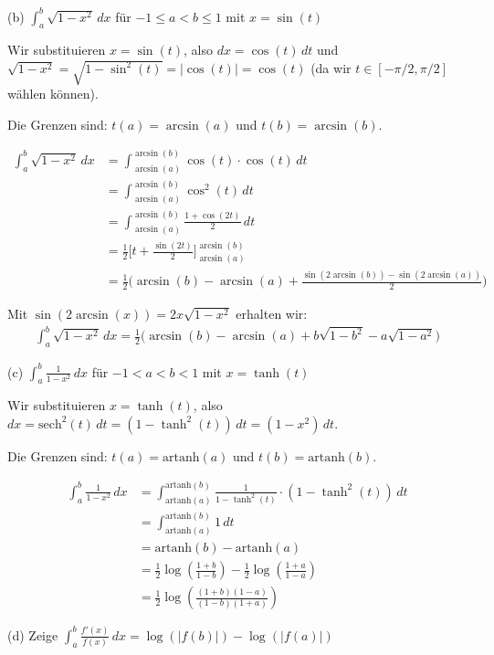 \documentclass{article}
\begin{document}
(b) $\int_a^b \sqrt{1-x^2}\,dx$ für $-1 \leq a < b \leq 1$ mit $x = \sin(t)$

Wir substituieren $x = \sin(t)$, also $dx = \cos(t)\,dt$ und $\sqrt{1-x^2} = \sqrt{1-\sin^2(t)} = |\cos(t)| = \cos(t)$ 
(da wir $t \in [-\pi/2, \pi/2]$ wählen können).

Die Grenzen sind: $t(a) = \arcsin(a)$ und $t(b) = \arcsin(b)$.

\begin{align}
\int_a^b \sqrt{1-x^2}\,dx &= \int_{\arcsin(a)}^{\arcsin(b)} \cos(t) \cdot \cos(t)\,dt \\
&= \int_{\arcsin(a)}^{\arcsin(b)} \cos^2(t)\,dt \\
&= \int_{\arcsin(a)}^{\arcsin(b)} \frac{1 + \cos(2t)}{2}\,dt \\
&= \frac{1}{2}\Big[t + \frac{\sin(2t)}{2}\Big]_{\arcsin(a)}^{\arcsin(b)} \\
&= \frac{1}{2}\Big(\arcsin(b) - \arcsin(a) + \frac{\sin(2\arcsin(b)) - \sin(2\arcsin(a))}{2}\Big)
\end{align}

Mit $\sin(2\arcsin(x)) = 2x\sqrt{1-x^2}$ erhalten wir:
\begin{align}
\int_a^b \sqrt{1-x^2}\,dx = \frac{1}{2}\Big(\arcsin(b) - \arcsin(a) + b\sqrt{1-b^2} - a\sqrt{1-a^2}\Big)
\end{align}

(c) $\int_a^b \frac{1}{1-x^2}\,dx$ für $-1 < a < b < 1$ mit $x = \tanh(t)$

Wir substituieren $x = \tanh(t)$, also $dx = \mathrm{sech}^2(t)\,dt = (1-\tanh^2(t))\,dt = (1-x^2)\,dt$.

Die Grenzen sind: $t(a) = \mathrm{artanh}(a)$ und $t(b) = \mathrm{artanh}(b)$.

\begin{align}
\int_a^b \frac{1}{1-x^2}\,dx &= \int_{\mathrm{artanh}(a)}^{\mathrm{artanh}(b)} \frac{1}{1-\tanh^2(t)} \cdot (1-\tanh^2(t))\,dt \\
&= \int_{\mathrm{artanh}(a)}^{\mathrm{artanh}(b)} 1\,dt \\
&= \mathrm{artanh}(b) - \mathrm{artanh}(a) \\
&= \frac{1}{2}\log\left(\frac{1+b}{1-b}\right) - \frac{1}{2}\log\left(\frac{1+a}{1-a}\right) \\
&= \frac{1}{2}\log\left(\frac{(1+b)(1-a)}{(1-b)(1+a)}\right)
\end{align}

(d) Zeige $\int_a^b \frac{f'(x)}{f(x)}\,dx = \log(|f(b)|) - \log(|f(a)|)$
\end{document}
